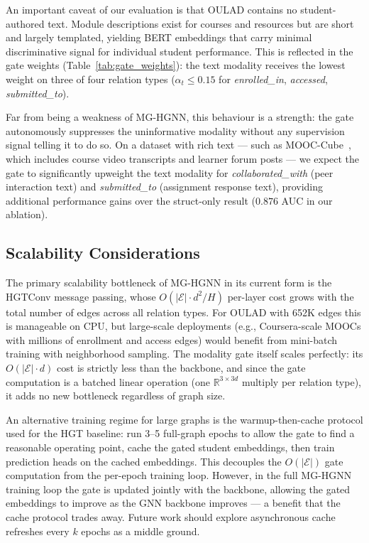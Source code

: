 \documentclass[sigconf]{acmart}
\begin{document}
An important caveat of our evaluation is that OULAD
contains no student-authored text. Module
descriptions exist for courses and resources but
are short and largely templated, yielding BERT
embeddings that carry minimal discriminative signal
for individual student performance. This is
reflected in the gate weights (Table~\ref{tab:gate_weights}):
the text modality receives the lowest weight on
three of four relation types ($\alpha_t \leq 0.15$
for \textit{enrolled\_in}, \textit{accessed},
\textit{submitted\_to}).

Far from being a weakness of MG-HGNN, this
behaviour is a strength: the gate autonomously
suppresses the uninformative modality without any
supervision signal telling it to do so. On a dataset
with rich text --- such as MOOC-Cube~\citep{yu2020mooccube}, which
includes course video transcripts and learner forum
posts ---
we expect the gate to significantly upweight the
text modality for \textit{collaborated\_with}
(peer interaction text) and \textit{submitted\_to}
(assignment response text), providing additional
performance gains over the struct-only result
($0.876$ AUC in our ablation).

\subsection{Scalability Considerations}

The primary scalability bottleneck of MG-HGNN in
its current form is the HGTConv message passing,
whose $O(|\mathcal{E}| \cdot d^2 / H)$ per-layer
cost grows with the total number of edges across
all relation types. For OULAD with 652K edges this
is manageable on CPU, but large-scale deployments
(e.g., Coursera-scale MOOCs with millions of
enrollment and access edges) would benefit from
mini-batch training with neighborhood sampling.
The modality gate itself scales perfectly: its
$O(|\mathcal{E}| \cdot d)$ cost is strictly less
than the backbone, and since the gate computation
is a batched linear operation (one
$\mathbb{R}^{3 \times 3d}$ multiply per relation
type), it adds no new bottleneck regardless of
graph size.

An alternative training regime for large graphs is
the warmup-then-cache protocol used for the HGT
baseline: run 3--5 full-graph epochs to allow the
gate to find a reasonable operating point, cache
the gated student embeddings, then train prediction
heads on the cached embeddings. This decouples the
$O(|\mathcal{E}|)$ gate computation from the
per-epoch training loop. However, in the full
MG-HGNN training loop the gate is updated jointly
with the backbone, allowing the gated embeddings to
improve as the GNN backbone improves --- a benefit
that the cache protocol trades away. Future work
should explore asynchronous cache refreshes every
$k$ epochs as a middle ground.
\end{document}
